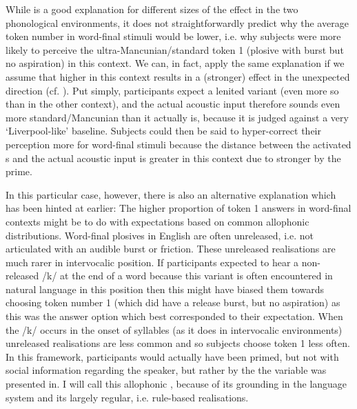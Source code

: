 While  is a good explanation for different sizes of the  effect in the two phonological environments, it does not straightforwardly predict why the average token number in word-final stimuli would be lower, i.e. why subjects were more likely to perceive the ultra-Mancunian/standard token 1 (plosive with burst but no aspiration) in this context.
We can, in fact, apply the same explanation if we assume that higher  in this context results in a (stronger)  effect in the unexpected direction (cf. ).
Put simply, participants expect a lenited variant (even more so than in the other context), and the actual acoustic input therefore sounds even more standard/Mancunian than it actually is, because it is judged against a very `Liverpool-like' baseline.
Subjects could then be said to hyper-correct their perception more for word-final stimuli because the distance between the activated s and the actual acoustic input is greater in this context due to stronger  by the prime.

In this particular case, however, there is also an alternative explanation which has been hinted at earlier: The higher proportion of token 1 answers in word-final contexts might be to do with expectations based on common allophonic distributions.
Word-final plosives in English are often unreleased, i.e. not articulated with an audible burst or friction.
These unreleased realisations are much rarer in intervocalic position.
If participants expected to hear a non-released /k/ at the end of a word because this variant is often encountered in natural language in this position then this might have biased them towards choosing token number 1 (which did have a release burst, but no aspiration) as this was the answer option which best corresponded to their expectation.
When the /k/ occurs in the onset of syllables (as it does in intervocalic environments) unreleased realisations are less common and so subjects choose token 1 less often.
In this framework, participants would actually have been primed, but not with social information regarding the speaker, but rather by the  the variable was presented in.
I will call this allophonic , because of its grounding in the language system and its largely regular, i.e. rule-based realisations.

